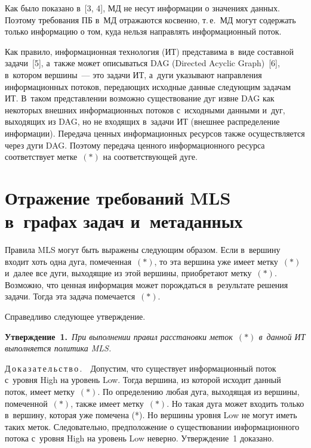 \begin{multicols}{2}
  Как было показано в~[3, 4], МД не несут информации о значениях данных. 
Поэтому требования ПБ в~МД отражаются косвенно, т.\,е.\ МД могут содержать 
только информацию о том, куда нельзя направлять информационный поток. 
  
  Как правило, информационная технология (ИТ) представима в~виде составной 
задачи~[5], а~так\-же может описываться DAG (Directed Acyclic Graph)~[6], 
в~котором вершины~--- это задачи ИТ, а~дуги указывают направления 
информационных потоков, передающих исходные данные сле\-ду\-ющим задачам ИТ. 
В~таком представлении возможно существование дуг извне DAG как некоторых 
внешних информационных потоков с~исходными данными и~дуг, выходящих из 
DAG, но не входящих в~задачи ИТ (внешнее распределение информации). 
Передача ценных информационных ресурсов также осуществляется через дуги 
DAG. Поэтому передача ценного информационного ресурса соответствует 
метке~$(*)$ на соответствующей дуге. 
  
\section{Отражение требований MLS в~графах задач и~метаданных} 
  
  Правила MLS могут быть выражены следующим образом. Если в~вершину 
входит хоть одна дуга, помеченная~$(*)$, то эта вершина уже имеет метку~$(*)$ 
и~далее все дуги, выходящие из этой вершины, приобретают метку~$(*)$. 
Возможно, что ценная информация может порождаться в~результате решения 
задачи. Тогда эта задача помечается~$(*)$. 
  
  Справедливо следующее утверждение. 
  
  \smallskip
  
  \noindent
  \textbf{Утверждение~1.}\ \textit{При выполнении правил расстановки 
меток~$(*)$ в~данной ИТ выполняется политика MLS. }
  
  \smallskip
  
  \noindent
  Д\,о\,к\,а\,з\,а\,т\,е\,л\,ь\,с\,т\,в\,о\,.\ \ Допустим, что существует 
информационный поток с~уровня High на уровень Low. Тогда вершина, из которой 
исходит данный поток, имеет метку~$(*)$. По определению любая дуга, 
выходящая из вершины, помеченной~$(*)$, также имеет метку~$(*)$. Но такая 
дуга может входить только в~вершину, которая уже помечена (*). Но вершины 
уровня Low не могут иметь таких меток. Следовательно, предположение о 
существовании информационного потока с~уровня High на уровень Low неверно. 
Утверждение~1 доказано.
  

\end{multicols}
